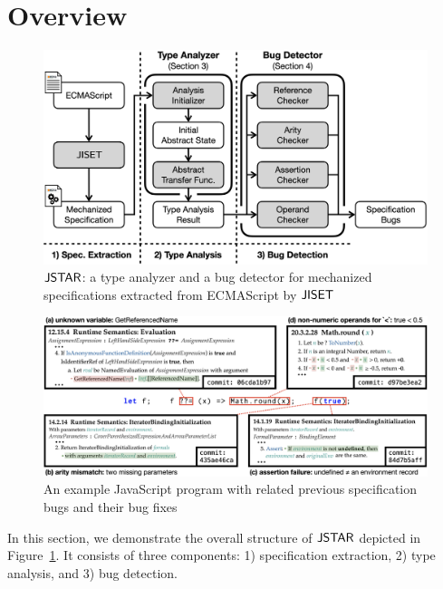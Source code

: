 \section{Overview}\label{sec:overview}

\begin{figure}
  \centering
  \includegraphics[width=\columnwidth]{img/overall}
  \caption{$\tool$: a type analyzer and a bug detector for
  mechanized specifications extracted from ECMAScript by $\jiset$}
  \label{fig:overall}
  \vspace*{-1.5em}
\end{figure}

\begin{figure}[t]
  \centering
  \includegraphics[width=.9\textwidth]{img/example}
  \caption{An example JavaScript program with related previous specification
  bugs and their bug fixes}
  \label{fig:example}
  \vspace*{-1.5em}
\end{figure}

In this section, we demonstrate the overall structure of $\tool$ depicted in
Figure~\ref{fig:overall}.  It consists of three components:
1) specification extraction, 2) type analysis, and 3) bug detection.


